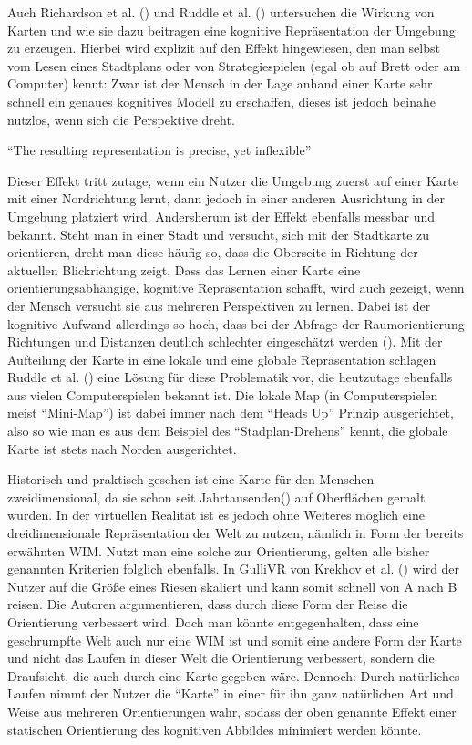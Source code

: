 Auch Richardson et al. (\cite{Richardson1999SpatialEnvironments}) und Ruddle et al. (\cite{Ruddle1999TheEnvironments}) untersuchen die Wirkung von Karten und wie sie dazu beitragen eine kognitive Repräsentation der Umgebung zu erzeugen.
Hierbei wird explizit auf den Effekt hingewiesen, den man selbst vom Lesen eines Stadtplans oder von Strategiespielen (egal ob auf Brett oder am Computer) kennt: Zwar ist der Mensch in der Lage anhand einer Karte sehr schnell ein genaues kognitives Modell zu erschaffen, dieses ist jedoch beinahe nutzlos, wenn sich die Perspektive dreht.

“The resulting representation is precise, yet inflexible”

Dieser Effekt tritt zutage, wenn ein Nutzer die Umgebung zuerst auf einer Karte mit einer Nordrichtung lernt, dann jedoch in einer anderen Ausrichtung in der Umgebung platziert wird. Andersherum ist der Effekt ebenfalls messbar und bekannt. Steht man in einer Stadt und versucht, sich mit der Stadtkarte zu orientieren, dreht man diese häufig so, dass die Oberseite in Richtung der aktuellen Blickrichtung zeigt. Dass das Lernen einer Karte eine orientierungsabhängige, kognitive Repräsentation schafft, wird auch gezeigt, wenn der Mensch versucht sie aus mehreren Perspektiven zu lernen. Dabei ist der kognitive Aufwand allerdings so hoch, dass bei der Abfrage der Raumorientierung Richtungen und Distanzen deutlich schlechter eingeschätzt werden (\cite{Richardson1999SpatialEnvironments}).
Mit der Aufteilung der Karte in eine lokale und eine globale Repräsentation schlagen Ruddle et al. (\cite{Ruddle1999TheEnvironments}) eine Lösung für diese Problematik vor, die heutzutage ebenfalls aus vielen Computerspielen bekannt ist. Die lokale Map (in Computerspielen meist “Mini-Map”) ist dabei immer nach dem “Heads Up” Prinzip ausgerichtet, also so wie man es aus dem Beispiel des “Stadplan-Drehens” kennt, die globale Karte ist stets nach Norden ausgerichtet.

Historisch und praktisch gesehen ist eine Karte für den Menschen zweidimensional, da sie schon seit Jahrtausenden(\cite{meece_2006}) auf Oberflächen gemalt wurden. 
In der virtuellen Realität ist es jedoch ohne Weiteres möglich eine dreidimensionale Repräsentation der Welt zu nutzen, nämlich in Form der bereits erwähnten WIM.
Nutzt man eine solche zur Orientierung, gelten alle bisher genannten Kriterien folglich ebenfalls.
In GulliVR von Krekhov et al. (\cite{Krekhov2018GulliVR}) wird der Nutzer auf die Größe eines Riesen skaliert und kann somit schnell von A nach B reisen. Die Autoren argumentieren, dass durch diese Form der Reise die Orientierung verbessert wird. Doch man könnte entgegenhalten, dass eine geschrumpfte Welt auch nur eine WIM ist und somit eine andere Form der Karte und nicht das Laufen in dieser Welt die Orientierung verbessert, sondern die Draufsicht, die auch durch eine Karte gegeben wäre.
Dennoch: Durch natürliches Laufen nimmt der Nutzer die “Karte” in einer für ihn ganz natürlichen Art und Weise aus mehreren Orientierungen wahr, sodass der oben genannte Effekt einer statischen Orientierung des kognitiven Abbildes minimiert werden könnte.

